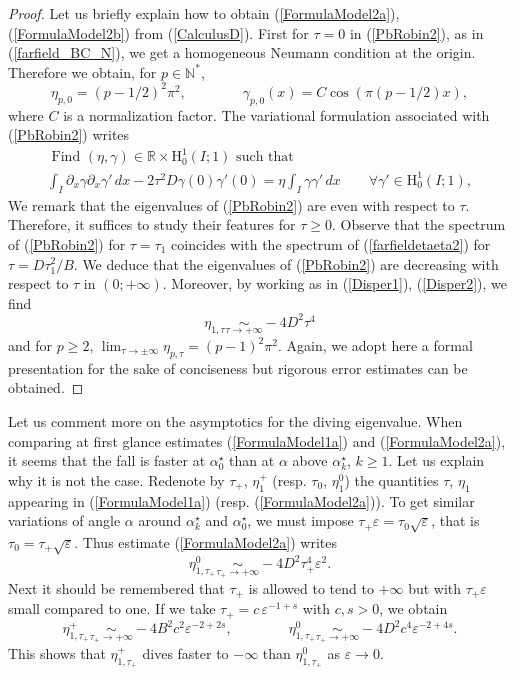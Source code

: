 \documentclass[11pt,a4paper]{article}
\newcommand{\dsp}{\displaystyle}
\newcommand{\eps}{\varepsilon}
\newcommand{\mrm}[1]{\mathrm{#1}}
\newcommand{\N}{\mathbb{N}}
\newcommand{\R}{\mathbb{R}}
\newcommand{\mH}{\mrm{H}}
\begin{document}
\begin{proof}
Let us briefly explain how to obtain (\ref{FormulaModel2a}), (\ref{FormulaModel2b}) from (\ref{CalculusD}). First for $\tau=0$ in (\ref{PbRobin2}), as in (\ref{farfield_BC_N}), we get a homogeneous Neumann condition at the origin. Therefore we obtain, for $p\in\N^\ast$,
\[
\eta_{p,0}=(p-1/2)^2\pi^2,\qquad\qquad  \gamma_{p,0}(x)=C \cos(\pi(p-1/2)x),
\]
where $C$ is a normalization factor. The variational formulation associated with (\ref{PbRobin2}) writes
\begin{equation}\label{VariationalForm1New}
\begin{array}{|l}
\mbox{ Find }(\eta,\gamma)\in\R\times \mH^1_{0}(I;1)\mbox{ such that }\\[3pt]
\dsp\int_I \partial_x\gamma\partial_x\gamma' \,dx-2\tau^2D\gamma(0)\gamma'(0) = \eta \int_I \gamma\gamma' \,dx\qquad \forall \gamma'\in\mH^1_{0}(I;1),
\end{array}
\end{equation}
We remark that the eigenvalues of (\ref{PbRobin2}) are even with respect to $\tau$. Therefore, it suffices to study their features for $\tau\ge0$. Observe that the spectrum of (\ref{PbRobin2}) for $\tau=\tau_1$ coincides with the spectrum  of (\ref{farfieldetaeta2}) for $\tau=D\tau_1^2/B$. We deduce that the eigenvalues  of (\ref{PbRobin2}) are decreasing with respect to $\tau$ in $(0;+\infty)$. Moreover, by working as in (\ref{Disper1}), (\ref{Disper2}), we find 
\[
\eta_{1,\tau}\underset{\tau\to+\infty}{\sim}-4D^2\tau^4
\]
and for $p\ge2$, $\lim_{\tau\to\pm\infty}\eta_{p,\tau}=(p-1)^2\pi^2$. Again, we adopt here a formal presentation for the sake of conciseness but rigorous error estimates can be obtained.
\end{proof}
\noindent Let us comment more on the asymptotics for the diving eigenvalue. When comparing at first glance estimates (\ref{FormulaModel1a}) and (\ref{FormulaModel2a}), it seems that the fall is faster at $\alpha_0^\star$ than at $\alpha$ above $\alpha_k^\star$, $k\ge1$. Let us explain why it is not the case. Redenote by $\tau_+$, $\eta^+_{1}$ (resp. $\tau_0$, $\eta^0_{1}$) the quantities $\tau$, $\eta_{1}$ appearing in (\ref{FormulaModel1a}) (resp. (\ref{FormulaModel2a})). To get similar variations of angle $\alpha$ around $\alpha_k^\star$ and $\alpha_0^\star$, we must impose $\tau_+\eps=\tau_0\sqrt{\eps}$, that is  $\tau_0=\tau_+\sqrt{\eps}$. Thus estimate (\ref{FormulaModel2a}) writes
\[
\eta^0_{1,\tau_+}\underset{\tau_+\to+\infty}{\sim}-4D^2\tau_+^4\eps^2.
\]
Next it should be remembered that $\tau_+$ is allowed to tend to $+\infty$ but with $\tau_+\eps$ small compared to one. If we take $\tau_+=c\,\eps^{-1+s}$ with $c,s>0$, we obtain 
\[
\eta^+_{1,\tau_+}\underset{\tau_+\to+\infty}{\sim}-4B^2c^2\eps^{-2+2s},\qquad\qquad
\eta^0_{1,\tau_+}\underset{\tau_+\to+\infty}{\sim}-4D^2c^4\eps^{-2+4s}.
\]
This shows that $\eta^+_{1,\tau_+}$ dives faster to $-\infty$ than $\eta^0_{1,\tau_+}$ as $\eps\to0$.
\end{document}
